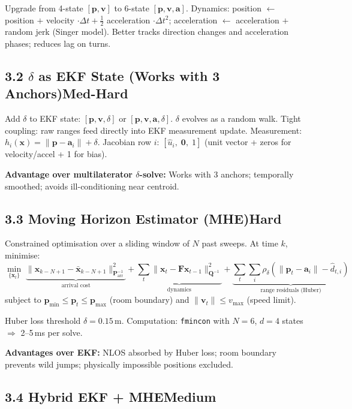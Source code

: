 \documentclass[11pt,a4paper]{article}
\newcommand{\mat}[1]{\mathbf{#1}}
\newcommand{\vect}[1]{\mathbf{#1}}
\newcommand{\dif}[1]{\texorpdfstring{\hfill#1}{}}
\newcommand{\medium}{\textcolor{dkorange}{\textbf{Medium}}}
\newcommand{\medhard}{\textcolor{dkorange}{\textbf{Med-Hard}}}
\newcommand{\hard}{\textcolor{dkred}{\textbf{Hard}}}
\begin{document}
Upgrade from 4-state $[\vect{p}, \vect{v}]$ to 6-state $[\vect{p}, \vect{v}, \vect{a}]$. Dynamics: position $\leftarrow$ position $+$ velocity $\cdot\Delta t + \tfrac{1}{2}$ acceleration $\cdot\Delta t^2$; acceleration $\leftarrow$ acceleration $+$ random jerk (Singer model). Better tracks direction changes and acceleration phases; reduces lag on turns.

\subsection{\texorpdfstring{3.2 $\delta$ as EKF State (Works with 3 Anchors)\dif{\medhard}}{3.2 delta as EKF State (Works with 3 Anchors)}}

Add $\delta$ to EKF state: $[\vect{p}, \vect{v}, \delta]$ or $[\vect{p}, \vect{v}, \vect{a}, \delta]$. $\delta$ evolves as a random walk. Tight coupling: raw ranges feed directly into EKF measurement update. Measurement: $h_i(\vect{x}) = \|\vect{p}-\vect{a}_i\| + \delta$. Jacobian row $i$: $[\hat{u}_i,\; \mathbf{0},\; 1]$ (unit vector + zeros for velocity/accel + 1 for bias).

\textbf{Advantage over multilaterator $\delta$-solve:} Works with 3 anchors; temporally smoothed; avoids ill-conditioning near centroid.

\subsection{3.3 Moving Horizon Estimator (MHE)\dif{\hard}}

Constrained optimisation over a sliding window of $N$ past sweeps. At time $k$, minimise:
\[
\min_{\{\vect{x}_t\}}\; \underbrace{\|\vect{x}_{k-N+1} - \bar{\vect{x}}_{k-N+1}\|^2_{\mat{P}_\text{arr}^{-1}}}_{\text{arrival cost}}
+ \underbrace{\sum_t \|\vect{x}_t - \mat{F}\vect{x}_{t-1}\|^2_{\mat{Q}^{-1}}}_{\text{dynamics}}
+ \underbrace{\sum_t\sum_i \rho_\delta\!\left(\|\vect{p}_t-\vect{a}_i\| - \hat{d}_{t,i}\right)}_{\text{range residuals (Huber)}}
\]
subject to $\vect{p}_\text{min} \leq \vect{p}_t \leq \vect{p}_\text{max}$ (room boundary) and $\|\vect{v}_t\| \leq v_\text{max}$ (speed limit).

Huber loss threshold $\delta = 0.15$\,m. Computation: \texttt{fmincon} with $N=6$, $d=4$ states $\Rightarrow$ 2--5\,ms per solve.

\textbf{Advantages over EKF:} NLOS absorbed by Huber loss; room boundary prevents wild jumps; physically impossible positions excluded.

\subsection{3.4 Hybrid EKF + MHE\dif{\medium}}
\end{document}
